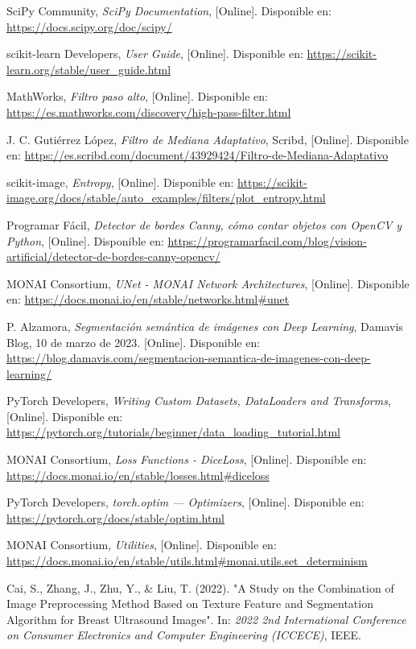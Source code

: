 \documentclass[12pt]{article}
\begin{document}
\begin{thebibliography}{9}
SciPy Community, \textit{SciPy Documentation}, [Online]. Disponible en: \url{https://docs.scipy.org/doc/scipy/}

scikit-learn Developers, \textit{User Guide}, [Online]. Disponible en: \url{https://scikit-learn.org/stable/user_guide.html}

MathWorks, \textit{Filtro paso alto}, [Online]. Disponible en: \url{https://es.mathworks.com/discovery/high-pass-filter.html}

J. C. Gutiérrez López, \textit{Filtro de Mediana Adaptativo}, Scribd, [Online]. Disponible en: \url{https://es.scribd.com/document/43929424/Filtro-de-Mediana-Adaptativo}

scikit-image, \textit{Entropy}, [Online]. Disponible en: \url{https://scikit-image.org/docs/stable/auto_examples/filters/plot_entropy.html}

Programar Fácil, \textit{Detector de bordes Canny, cómo contar objetos con OpenCV y Python}, [Online]. Disponible en: \url{https://programarfacil.com/blog/vision-artificial/detector-de-bordes-canny-opencv/}

MONAI Consortium, \textit{UNet - MONAI Network Architectures}, [Online]. Disponible en: \url{https://docs.monai.io/en/stable/networks.html#unet}

P. Alzamora, \textit{Segmentación semántica de imágenes con Deep Learning}, Damavis Blog, 10 de marzo de 2023. [Online]. Disponible en: \url{https://blog.damavis.com/segmentacion-semantica-de-imagenes-con-deep-learning/}

PyTorch Developers, \textit{Writing Custom Datasets, DataLoaders and Transforms}, [Online]. Disponible en: \url{https://pytorch.org/tutorials/beginner/data_loading_tutorial.html}

MONAI Consortium, \textit{Loss Functions - DiceLoss}, [Online]. Disponible en: \url{https://docs.monai.io/en/stable/losses.html#diceloss}

PyTorch Developers, \textit{torch.optim — Optimizers}, [Online]. Disponible en: \url{https://pytorch.org/docs/stable/optim.html}

MONAI Consortium, \textit{Utilities}, [Online]. Disponible en: \url{https://docs.monai.io/en/stable/utils.html#monai.utils.set_determinism}

Cai, S., Zhang, J., Zhu, Y., \& Liu, T. (2022). "A Study on the Combination of Image Preprocessing Method Based on Texture Feature and Segmentation Algorithm for Breast Ultrasound Images". In: \textit{2022 2nd International Conference on Consumer Electronics and Computer Engineering (ICCECE)}, IEEE.



\end{thebibliography}
\end{document}
